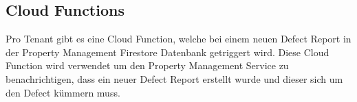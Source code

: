 \subsection{Cloud Functions}
Pro Tenant gibt es eine Cloud Function, welche bei einem neuen Defect Report in der Property Management Firestore Datenbank getriggert wird. Diese Cloud Function wird verwendet um den Property Management Service zu benachrichtigen, dass ein neuer Defect Report erstellt wurde und dieser sich um den Defect kümmern muss.